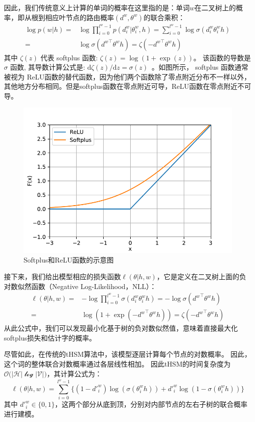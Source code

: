  因此，我们传统意义上计算的单词的概率在这里指的是：单词$ w $在二叉树上的概率，即从根到相应叶节点的路由概率$(d^w,\theta^w)$的联合乘积：
\begin{equation}\label{equ:pw}
\begin{split}
 \log p(w|h)=&\log\prod_{i=0}^{l^w-1} p(d^w_i|\theta_{i}^w,h) = \sum_{i=0}^{l^w -1} \log\sigma(d_i^w \theta_{i}^w h)\\
 =&\log\sigma({d^w}^\top \theta^w h)=\zeta(- {d^w}^\top \theta^w h )
 \end{split}
\end{equation}
其中 $\zeta(z)$ 代表 softplus 函数: $\zeta(z)= \log (1+\exp(z))$。 该函数的导数是 $\sigma$ 函数, 其导数计算公式是: ${\mathrm{d}\zeta(z)}/{\mathrm{d} z}= \sigma(z)$~。如图所示， softplus 函数通常被视为 ReLU函数的替代函数，因为他们两个函数除了零点附近分布不一样以外，其他地方分布相同。但是softplus函数在零点附近可导，ReLU函数在零点附近不可导。
\begin{figure}[!ht]
  \centering
\includegraphics[width=0.6\linewidth]{./figures/relus.pdf}
\caption{Softplus和ReLU函数的示意图}\label{fig:soft}
\end{figure}

接下来，我们给出模型相应的损失函数$ \ell(\theta | h,w)$，它是定义在二叉树上面的负对数似然函数（Negative Log-Likelihood，NLL）：
\begin{equation}\label{equ:cost}
\begin{split}
   \ell(\theta|h,w) =&-\log\prod_{i=0}^{l^w -1} \sigma(d_i^w \theta_{i}^w h) = -\log \sigma({d^w}^\top \theta^w h)\\
    =& \log (1+\exp(- {d^w}^\top \theta^w h )) =  \zeta(- {d^w}^\top \theta^w h )
\end{split}
\end{equation}
从此公式中，我们可以发现最小化基于树的负对数似然值，意味着直接最大化softplus损失和估计字的概率。

尽管如此，在传统的tHSM算法中，该模型逐层计算每个节点的对数概率。 因此，这个词的整体联合对数概率通过各层线性相加。 因此tHSM的时间复杂度为$\mathcal{O(|H|\log|V|})$，其计算公式为：
\begin{equation}
\ell(\theta|h,w) =\sum_{i=0}^{l^w-1} \{(1-d'^w_i)\log (\sigma(\theta_{i}^w h))  + {d'^w_i}\log (1-\sigma (\theta_{i}^w h))\}
\end{equation}
其中 $d'^w_i\in \{0,1\}$，这两个部分从底到顶，分别对内部节点的左右子树的联合概率进行建模。


